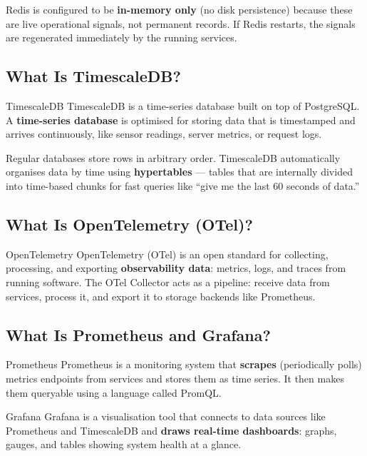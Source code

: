 \documentclass[12pt, a4paper]{article}
\begin{document}
Redis is configured to be \textbf{in-memory only} (no disk persistence) because
these are live operational signals, not permanent records. If Redis restarts, the
signals are regenerated immediately by the running services.

\subsection{What Is TimescaleDB?}

\begin{definitionbox}{TimescaleDB}
TimescaleDB is a time-series database built on top of PostgreSQL. A
\textbf{time-series database} is optimised for storing data that is
timestamped and arrives continuously, like sensor readings, server metrics, or
request logs.
\end{definitionbox}

Regular databases store rows in arbitrary order. TimescaleDB automatically
organises data by time using \textbf{hypertables} --- tables that are
internally divided into time-based chunks for fast queries like
``give me the last 60 seconds of data.''

\subsection{What Is OpenTelemetry (OTel)?}

\begin{definitionbox}{OpenTelemetry}
OpenTelemetry (OTel) is an open standard for collecting, processing, and
exporting \textbf{observability data}: metrics, logs, and traces from running
software. The OTel Collector acts as a pipeline: receive data from services,
process it, and export it to storage backends like Prometheus.
\end{definitionbox}

\subsection{What Is Prometheus and Grafana?}

\begin{definitionbox}{Prometheus}
Prometheus is a monitoring system that \textbf{scrapes} (periodically polls)
metrics endpoints from services and stores them as time series. It then makes
them queryable using a language called PromQL.
\end{definitionbox}

\begin{definitionbox}{Grafana}
Grafana is a visualisation tool that connects to data sources like Prometheus
and TimescaleDB and \textbf{draws real-time dashboards}: graphs, gauges, and
tables showing system health at a glance.
\end{definitionbox}
\end{document}
